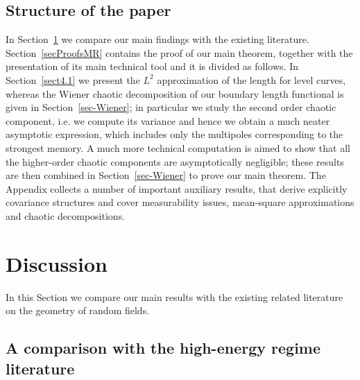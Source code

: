 \documentclass[AHL,Unicode,longabstracts,published]{cedram}
\begin{document}
\subsection{Structure of the paper}

In Section~\ref{sec-discussion} we compare our main findings with the existing literature. Section~\ref{secProofsMR} contains the proof of our main theorem, together with the presentation of its main technical tool and it is divided as follows. In Section~\ref{sect4.1} we present the $L^2$ approximation of the length for level curves, whereas the Wiener chaotic decomposition of our boundary length functional is given in Section~\ref{sec-Wiener}; in particular we study the second order chaotic component, i.e. we compute its variance and hence we obtain a much neater asymptotic expression, which includes only the multipoles corresponding to the strongest memory. A much more technical computation is aimed to show that all the higher-order chaotic components are asymptotically negligible; these results are then combined in Section~\ref{sec-Wiener} to prove our main theorem. The Appendix collects a number of important auxiliary results, that derive explicitly covariance structures and cover measurability issues, mean-square approximations and chaotic decompositions.



\section{Discussion}
\label{sec-discussion}

In this Section we compare our main results with the existing related literature on the geometry of random fields.

\subsection{A comparison with the high-energy regime literature}\label{secHigh}
\end{document}
